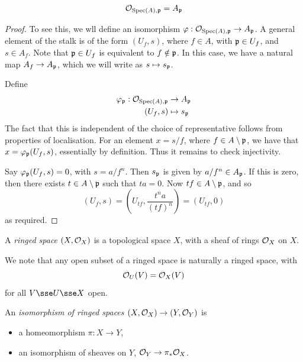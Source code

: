 \documentclass{article}
\begin{document}
\begin{remark}
    \[\mathcal{O}_{\operatorname{Spec}(A), \mathfrak{p}} = A_{\mathfrak{p}}\]
\end{remark}

\begin{addendum}
    \begin{proof}
        To see this, we wll define an isomorphism \(\varphi : \mathcal{O}_{\operatorname{Spec}(A), \mathfrak{p}} \to A_{\mathfrak{p}}\). A general element of the stalk is of the form \((U_f, s)\), where \(f \in A\), with \(\mathfrak{p} \in U_f\), and \(s \in A_f\). Note that \(\mathfrak{p} \in U_f\) is equivalent to \(f \notin \mathfrak{p}\). In this case, we have a natural map \(A_f \to A_{\mathfrak{p}}\), which we will write as \(s \mapsto s_{\mathfrak{p}}\).

        Define
        \begin{align*}
            \varphi_{\mathfrak{p}} : \mathcal{O}_{\operatorname{Spec}(A), \mathfrak{p}} &\to A_{\mathfrak{p}} \\
            (U_f, s) &\mapsto s_{\mathfrak{p}}
        \end{align*}
        The fact that this is independent of the choice of representative follows from properties of localisation. For an element \(x = s/f\), where \(f \in A \setminus \mathfrak{p}\), we have that \(x = \varphi_{\mathfrak{p}}(U_f, s)\), essentially by definition. Thus it remains to check injectivity.

        Say \(\varphi_{\mathfrak{p}}(U_f, s) = 0\), with \(s = a/f^n\). Then \(s_{\mathfrak{p}}\) is given by \(a/f^n \in A_{\mathfrak{p}}\). If this is zero, then there exists \(t \in A \setminus \mathfrak{p}\) such that \(ta = 0\). Now \(tf \in A \setminus \mathfrak{p}\), and so
        \[(U_f, s) = \left(U_{tf}, \frac{t^na}{(tf)^n}\right) = (U_{tf}, 0)\]
        as required.
    \end{proof}
\end{addendum}

\begin{definition}
     A \emph{ringed space} \((X, \mathcal{O}_X)\) is a topological space \(X\), with a sheaf of rings \(\mathcal{O}_X\) on \(X\).
\end{definition}

We note that any open subset of a ringed space is naturally a ringed space, with
\[\mathcal{O}_U(V) = \mathcal{O}_X(V)\]
for all \(V \sse U \sse X\) open.

\begin{definition}

    An \emph{isomorphism of ringed spaces \((X, \mathcal{O}_X) \to (Y, \mathcal{O}_Y)\)} is
    \begin{itemize}
        \item a homeomorphism \(\pi : X \to Y\),
        \item an isomorphism of sheaves on \(Y\), \(\mathcal{O}_Y \to \pi_*\mathcal{O}_X\).
    \end{itemize}
\end{definition}
\end{document}
